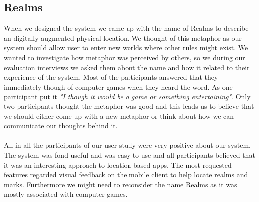 \subsection{Realms} %
\label{sub:realms}
When we designed the system we came up with the name of Realms to describe an digitally augmented physical location. We thought of this metaphor as our system should allow user to enter new worlds where other rules might exist. We wanted to investigate how metaphor was perceived by others, so we during our evaluation interviews we asked them about the name and how it related to their experience of the system.
Most of the participants answered that they immediately though of computer games when they heard the word. As one participant put it \emph{"I though it would be a game or something entertaining"}. Only two participants thought the metaphor was good and this leads us to believe that we should either come up with a new metaphor or think about how we can communicate our thoughts behind it. 
\\\\
All in all the participants of our user study were very positive about our system. The system was fond useful and was easy to use and all participants believed that it was an interesting approach to location-based apps. The most requested features regarded visual feedback on the mobile client to help locate realms and marks. Furthermore we might need to reconsider the name Realms as it was mostly associated with computer games. 

